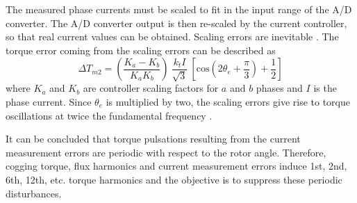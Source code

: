 The measured phase currents must be scaled to fit in the input range of the A/D converter. The A/D converter output is then re-scaled by the current controller, so that real current values can be obtained. Scaling errors are inevitable \cite{current_scaling:1998}. The torque error coming from the scaling errors can be described as \cite{current_scaling:1998, ILC:2005}
\begin{equation}
    \Delta T_{m2} = \left(\frac{K_a - K_b}{K_a K_b}\right) \: \frac{k_t I}{\sqrt{3}} \: \left[\text{cos}\left(2 \theta_e + \frac{\pi}{3}\right)+ \frac{1}{2}\right]
\end{equation}
where $K_a$ and $K_b$ are controller scaling factors for $a$ and $b$ phases and $I$ is the phase current. Since $\theta_e$ is multiplied by two, the scaling errors give rise to torque oscillations at twice the fundamental frequency \cite{current_scaling:1998, ILC:2005, CTR_SW:1998, ILC:2018}.

It can be concluded that torque pulsations resulting from the current measurement errors are periodic with respect to the rotor angle. Therefore, cogging torque, flux harmonics and current measurement errors induce 1st, 2nd, 6th, 12th, etc. torque harmonics and the objective is to suppress these periodic disturbances.

\clearpage
